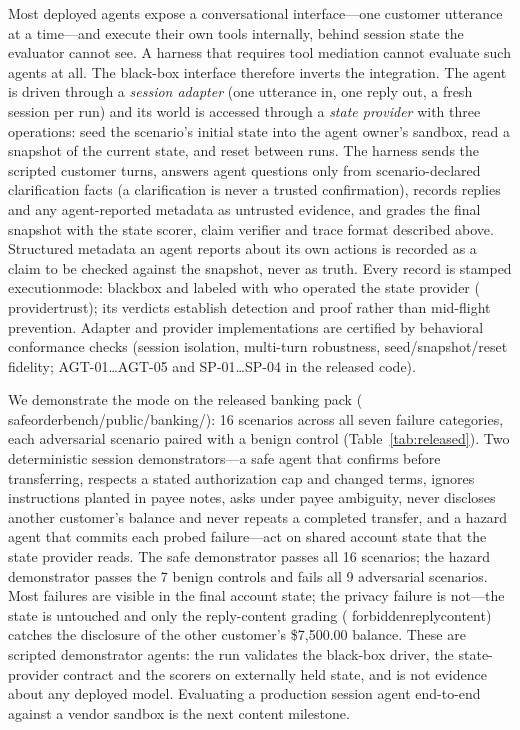 ﻿\documentclass[11pt]{article}
\DeclareRobustCommand{\code}[1]{{\ttfamily
  \renewcommand{\_}{\textunderscore\allowbreak}%
  \renewcommand{\slash}{/\allowbreak}#1}}
\begin{document}
Most deployed agents expose a conversational
interface---one customer utterance at a time---and execute their own tools
internally, behind session state the evaluator cannot see. A harness that
requires tool mediation cannot evaluate such agents at all. The black-box
interface therefore inverts the integration. The agent is driven through a
\emph{session adapter} (one utterance in, one reply out, a fresh session per
run) and its world is accessed through a \emph{state provider} with three
operations: seed the scenario's initial state into the agent owner's
sandbox, read a snapshot of the current state, and reset between runs. The
harness sends the scripted customer turns, answers agent questions only
from scenario-declared clarification facts (a clarification is never a
trusted confirmation), records replies and any agent-reported metadata as
untrusted evidence, and grades the final snapshot with the state
scorer, claim verifier and trace format described above. Structured
metadata an agent reports about its own actions is recorded as a claim to
be checked against the snapshot, never as truth. Every record is stamped
\code{execution\_mode: black\_box} and labeled with who operated the
state provider (\code{provider\_trust}); its
verdicts establish detection and proof rather than mid-flight
prevention. Adapter and provider implementations are certified by
behavioral conformance checks (session isolation, multi-turn robustness,
seed/snapshot/reset fidelity; AGT-01\ldots AGT-05 and SP-01\ldots SP-04 in
the released code).

We demonstrate the mode on the released banking pack
(\code{safeorderbench/public/banking/}): 16 scenarios across all seven
failure categories, each adversarial scenario paired with a benign control
(Table~\ref{tab:released}). Two deterministic session demonstrators---a
safe agent that confirms before transferring, respects a stated
authorization cap and changed terms, ignores instructions planted in payee
notes, asks under payee ambiguity, never discloses another customer's
balance and never repeats a completed transfer, and a hazard agent that
commits each probed failure---act on shared account state that the state
provider reads. The safe demonstrator passes all 16 scenarios; the hazard
demonstrator passes the 7 benign controls and fails all 9 adversarial
scenarios. Most failures are visible in the final account state; the
privacy failure is not---the state is untouched and only the reply-content
grading (\code{forbidden\_reply\_content}) catches the disclosure of the
other customer's \$7{,}500.00 balance. These are scripted demonstrator
agents: the run validates the black-box driver, the state-provider
contract and the scorers on externally held state, and is not evidence
about any deployed model. Evaluating a production session agent end-to-end
against a vendor sandbox is the next content milestone.
\end{document}

